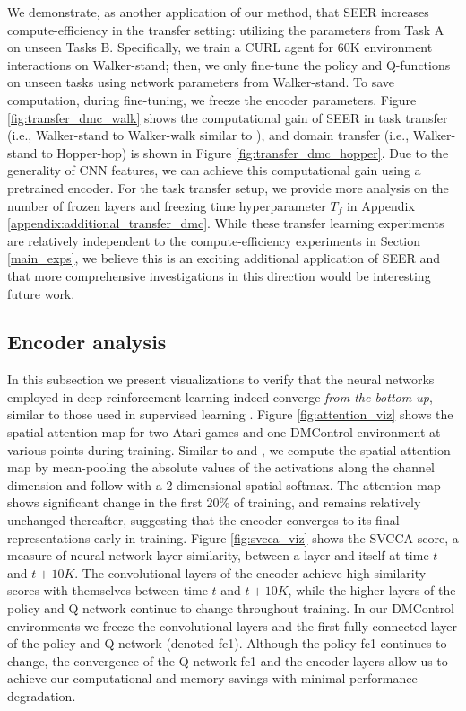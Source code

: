\documentclass{article}
\begin{document}
We demonstrate, as another application of our method, that SEER increases compute-efficiency in the transfer setting: utilizing the parameters from Task A on unseen Tasks B.
Specifically,
we train a CURL agent for 60K environment interactions on Walker-stand; 
then, we only fine-tune the policy and Q-functions on unseen tasks using network parameters from Walker-stand.
To save computation, during fine-tuning, we freeze the encoder parameters.
Figure \ref{fig:transfer_dmc_walk} shows the computational gain of SEER in task transfer (i.e., Walker-stand to Walker-walk similar to \citet{yarats2019improving}), and domain transfer (i.e., Walker-stand to Hopper-hop) is shown in Figure \ref{fig:transfer_dmc_hopper}. Due to the generality of CNN features,
we can achieve this computational gain using a pretrained encoder.
For the task transfer setup, we provide more analysis on the number of frozen layers and freezing time hyperparameter $T_f$ in Appendix \ref{appendix:additional_transfer_dmc}. 
While these transfer learning experiments are relatively independent to the compute-efficiency experiments in Section \ref{main_exps}, we believe this is an exciting additional application of SEER and that more comprehensive investigations in this direction would be interesting future work.

\subsection{Encoder analysis}

In this subsection we present visualizations to verify that the neural networks employed in deep reinforcement learning indeed converge {\em from the bottom up}, similar to those used in supervised learning \citep{46337}. 
Figure \ref{fig:attention_viz} shows the spatial attention map for two Atari games and one DMControl environment at various points during training. Similar to \citet{laskin2020reinforcement} and \citet{zagoruyko2016paying}, we compute the spatial attention map by mean-pooling the absolute values of
the activations along the channel dimension and follow with a 2-dimensional spatial softmax.
The attention map shows significant change in the first $20\%$ of training, and remains relatively unchanged thereafter, suggesting that the encoder converges to its final representations early in training. Figure \ref{fig:svcca_viz} shows the SVCCA \citep{46337} score, a measure of neural network layer similarity, between a layer and itself at time $t$ and $t + 10K$. The convolutional layers of the encoder achieve high similarity scores with themselves between time $t$ and $t + 10K$, while the higher layers of the policy and Q-network continue to change throughout training. In our DMControl environments we freeze the convolutional layers and the first fully-connected layer of the policy and Q-network (denoted fc1). Although the policy fc1 continues to change, the convergence of the Q-network fc1 and the encoder layers allow us to achieve our computational and memory savings with minimal performance degradation.
\end{document}
